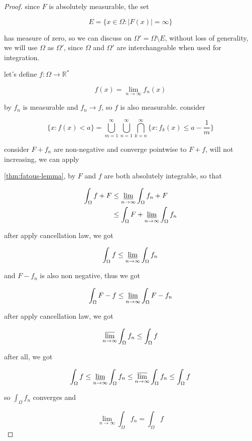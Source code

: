 \begin{proof}
    since $F$ is absolutely measurable, the set

    \[
        E = \{ x \in \Omega: |F(x)| = \infty \}
    \]

    has measure of zero, so we can discuss on $\Omega' = \Omega \setminus E$, without loss of generality, 
    we will use $\Omega$ as $\Omega'$, since $\Omega$ and $\Omega'$ are interchangeable when used for integration.

    let's define $f: \Omega \to \mathbb{R}^*$

    \[
        f(x) = \lim_{n \to \infty}f_n(x)
    \]

    by $f_n$ is measurable and $f_n \to f$, so $f$ is also measurable. consider

    \[
        \{x: f(x) < a \} = \bigcup_{m=1}^{\infty} \bigcup_{n=1}^{\infty} \bigcap_{k=n}^{\infty} \{x: f_k(x) \le a - \frac{1}{m}\}
    \]

    consider $F + f_n$ are non-negative and converge pointwise to $F+f$, will not increasing, we can apply 

    \autoref{thm:fatous-lemma}, by $F$ and $f$ are both absolutely integrable, so that

    \begin{align*}
        \int_{\Omega} f + F &\le \varliminf_{n \to \infty} \int_{\Omega} f_n + F \\
        & \le \int_{\Omega}F + \varliminf_{n \to \infty} \int_{\Omega} f_n
    \end{align*}

    after apply cancellation law, we got

    \[
        \int_{\Omega}f \le \varliminf_{n \to \infty} \int_{\Omega} f_n
    \]

    and $F - f_n$ is also non negative, thus we got

    \[
        \int_{\Omega} F - f \le \varliminf_{n \to \infty}\int_{\Omega} F - f_n
    \]

    after apply cancellation law, we got

    \[
        \varlimsup_{n \to \infty} \int_{\Omega} f_n \le \int_{\Omega}f
    \]

    after all, we got

    \[
 \int_{\Omega}f \le \varliminf_{n \to \infty} \int_{\Omega} f_n \le       \varlimsup_{n \to \infty} \int_{\Omega} f_n \le \int_{\Omega}f 
    \]

    so $\int_{\Omega} f_n$ converges and

    \[
\lim_{n \to \infty} \int_{\Omega} f_n = \int_{\Omega} f
    \]

\end{proof}

